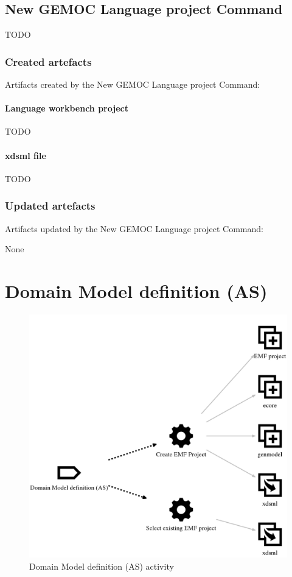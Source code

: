 \documentclass{gemoc} %
\begin{document}
\subsection{New GEMOC Language project Command}
TODO
\subsubsection{Created artefacts}
Artifacts created by the New GEMOC Language project Command:
\paragraph{Language workbench project} 
TODO\paragraph{xdsml file} 
TODO
\subsubsection{Updated artefacts}
Artifacts updated by the New GEMOC Language project Command:

	None

\section{Domain Model definition (AS)}
\label{sec:Domain_Model_definition__AS_}
\begin{figure}[h!]
		\center
		\includegraphics*[trim=0.0cm 0.0cm 0cm 0.0cm, clip=true]{fig/Domain_Model_definition__AS_}
		\caption{Domain Model definition (AS) activity}
		\label{fig:Domain_Model_definition__AS_}
\end{figure}
\end{document}
